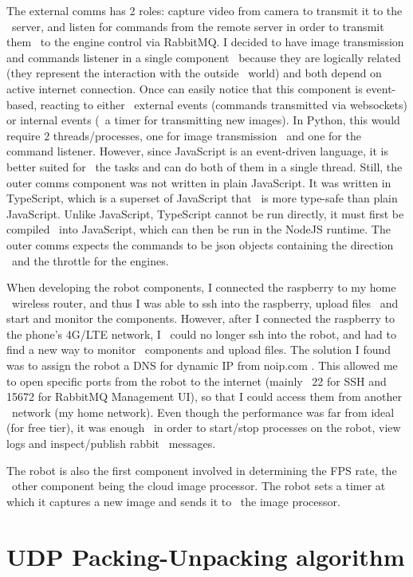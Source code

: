 The external comms has 2 roles: capture video from camera to transmit it to the \
server, and listen for commands from the remote server in order to transmit them \
to the engine control via RabbitMQ.
I decided to have image transmission and commands listener in a single component \
because they are logically related (they represent the interaction with the outside \
world) and both depend on active internet connection.
Once can easily notice that this component is event-based, reacting to either \
external events (commands transmitted via websockets) or internal events (\
a timer for transmitting new images).
In Python, this would require 2 threads/processes, one for image transmission \
and one for the command listener.
However, since JavaScript is an event-driven language, it is better suited for \
the tasks and can do both of them in a single thread.
Still, the outer comms component was not written in plain JavaScript.
It was written in TypeScript, which is a superset of JavaScript that \
is more type-safe than plain JavaScript.
Unlike JavaScript, TypeScript cannot be run directly, it must first be compiled \
into JavaScript, which can then be run in the NodeJS runtime.
The outer comms expects the commands to be json objects containing the direction \
and the throttle for the engines.


When developing the robot components, I connected the raspberry to my home \
wireless router, and thus I was able to ssh into the raspberry, upload files \
and start and monitor the components.
However, after I connected the raspberry to the phone's 4G/LTE network, I \
could no longer ssh into the robot, and had to find a new way to monitor \
components and upload files.
The solution I found was to assign the robot a DNS for dynamic IP from noip.com .
This allowed me to open specific ports from the robot to the internet (mainly \
22 for SSH and 15672 for RabbitMQ Management UI), so that I could access them from another \
network (my home network).
Even though the performance was far from ideal (for free tier), it was enough \
in order to start/stop processes on the robot, view logs and inspect/publish rabbit \
messages.

The robot is also the first component involved in determining the FPS rate, the \
other component being the cloud image processor.
The robot sets a timer at which it captures a new image and sends it to \
the image processor.

\section{UDP Packing-Unpacking algorithm}
\label{sec:udp-packing-algorithm}


